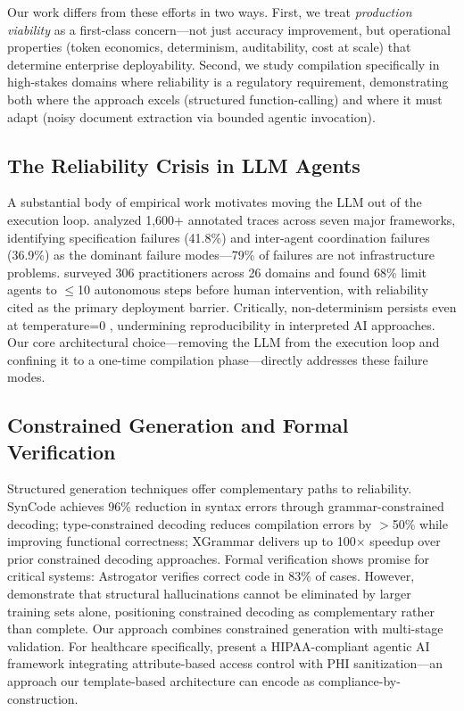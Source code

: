\documentclass[11pt]{article}
\begin{document}
Our work differs from these efforts in two ways. First, we treat \emph{production viability} as a first-class concern---not just accuracy improvement, but operational properties (token economics, determinism, auditability, cost at scale) that determine enterprise deployability. Second, we study compilation specifically in high-stakes domains where reliability is a regulatory requirement, demonstrating both where the approach excels (structured function-calling) and where it must adapt (noisy document extraction via bounded agentic invocation).

\subsection{The Reliability Crisis in LLM Agents}
\label{sec:related-reliability}

A substantial body of empirical work motivates moving the LLM out of the execution loop. \citet{cemri2025multiagent} analyzed 1,600+ annotated traces across seven major frameworks, identifying specification failures (41.8\%) and inter-agent coordination failures (36.9\%) as the dominant failure modes---79\% of failures are not infrastructure problems. \citet{pan2025measuring} surveyed 306 practitioners across 26 domains and found 68\% limit agents to $\leq$10 autonomous steps before human intervention, with reliability cited as the primary deployment barrier. Critically, non-determinism persists even at temperature=0 \citep{ouyang2023nondeterminism, atil2024nondeterminism}, undermining reproducibility in interpreted AI approaches. Our core architectural choice---removing the LLM from the execution loop and confining it to a one-time compilation phase---directly addresses these failure modes.

\subsection{Constrained Generation and Formal Verification}
\label{sec:related-constrained}

Structured generation techniques offer complementary paths to reliability. SynCode \citep{ugare2024syncode} achieves 96\% reduction in syntax errors through grammar-constrained decoding; type-constrained decoding \citep{mundler2025typeconstrained} reduces compilation errors by $>$50\% while improving functional correctness; XGrammar \citep{dong2024xgrammar} delivers up to 100$\times$ speedup over prior constrained decoding approaches. Formal verification shows promise for critical systems: Astrogator \citep{councilman2025astrogator} verifies correct code in 83\% of cases. However, \citet{xu2024hallucination} demonstrate that structural hallucinations cannot be eliminated by larger training sets alone, positioning constrained decoding as complementary rather than complete. Our approach combines constrained generation with multi-stage validation. For healthcare specifically, \citet{neupane2025hipaa} present a HIPAA-compliant agentic AI framework integrating attribute-based access control with PHI sanitization---an approach our template-based architecture can encode as compliance-by-construction.
\end{document}
